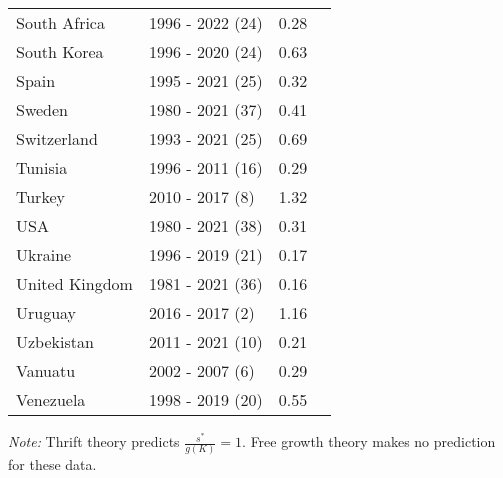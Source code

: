 \begin{table}[pos=h]
{{\begin{tabular}{llrr}
South Africa & 1996 - 2022 (24) & 0.28\\
South Korea & 1996 - 2020 (24) & 0.63\\
Spain & 1995 - 2021 (25) & 0.32\\
\addlinespace
Sweden & 1980 - 2021 (37) & 0.41\\
Switzerland & 1993 - 2021 (25) & 0.69\\
Tunisia & 1996 - 2011 (16) & 0.29\\
Turkey & 2010 - 2017 (8) & 1.32\\
USA & 1980 - 2021 (38) & 0.31\\
\addlinespace
Ukraine & 1996 - 2019 (21) & 0.17\\
United Kingdom & 1981 - 2021 (36) & 0.16\\
Uruguay & 2016 - 2017 (2) & 1.16\\
Uzbekistan & 2011 - 2021 (10) & 0.21\\
Vanuatu & 2002 - 2007 (6) & 0.29\\
\addlinespace
Venezuela & 1998 - 2019 (20) & 0.55\\ \end{tabular}

}
}
\hline
\begin{flushleft}
\footnotesize \emph{Note:} Thrift theory predicts \(\frac{s^*}{g(K)} = 1\). Free growth theory makes no prediction for these data.
\end{flushleft}
\end{table}